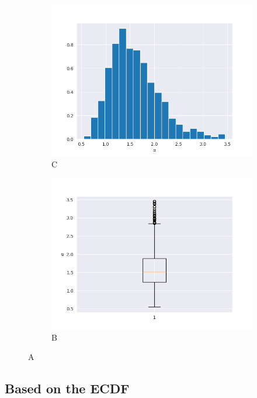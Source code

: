 \documentclass{article}
\begin{document}
		\begin{figure}
			\begin{subfigure}{.5\textwidth}
				\centering
				\includegraphics[width=1\linewidth]{images/cdf_alpha_hist.png}
				\caption{C}
			\end{subfigure}
			\begin{subfigure}[r]{.5\textwidth}
				\centering
				\includegraphics[width=1\linewidth]{images/cdf_alpha_boxplot.png}
				\caption{B}
			\end{subfigure}
			\caption{A}
		\end{figure}
		
		\subsection{Based on the ECDF}
\end{document}
